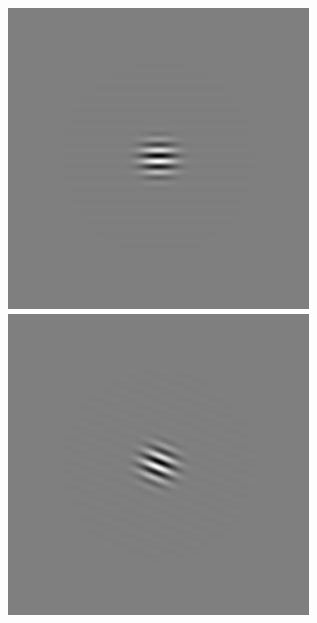 \begin{figure}[ht]
\begin{center}
 \includegraphics[width=\columnwidth/9]{ch4/figures/rGabor2_4.jpg}
 \includegraphics[width=\columnwidth/9]{ch4/figures/rGabor2_5.jpg}

\end{center}
\end{figure}
